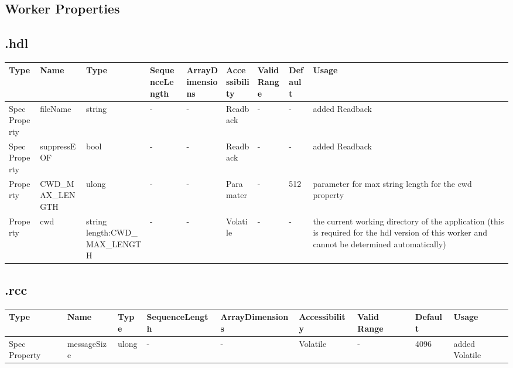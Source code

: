 \begin{landscape}
	\section*{Worker Properties}
	\subsection*{\comp.hdl}
	\begin{scriptsize}
\begin{tabular}{|p{2cm}|p{2.75cm}|p{3.5cm}|p{2cm}|p{2cm}|p{2.25cm}|p{1.5cm}|p{1cm}|p{4cm}|}
			\hline
			\rowcolor{blue}
			Type     & Name                      & Type  & SequenceLength & ArrayDimensions & Accessibility       & Valid Range & Default & Usage                                      \\
			\hline
			Spec Property & fileName & string  & - & - & Readback & -  &- & added Readback
            \\
            \hline
            Spec Property & suppressEOF & bool  & - & - & Readback & -  &- & added Readback
            \\
            \hline
            Property & CWD\_MAX\_LENGTH & ulong  & - & - & Paramater & -  & 512 & parameter for max string length for the cwd property
            \\
            \hline
            Property & cwd & string length:CWD\_MAX\_LENGTH & - & - & Volatile & -  &- & the current working directory of the application (this is required for the hdl version of this worker and cannot be determined automatically)
            \\
            \hline
    \end{tabular}
	\end{scriptsize}

	\subsection*{\comp.rcc}
    \begin{scriptsize}
    \begin{tabular}{|p{2cm}|p{2.75cm}|p{1cm}|p{2.75cm}|p{2cm}|p{2.25cm}|p{2cm}|p{1cm}|p{5cm}|}
			\hline
			\rowcolor{blue}
			Type     & Name                      & Type  & SequenceLength & ArrayDimensions & Accessibility       & Valid Range & Default & Usage                                      \\
			\hline
            Spec Property & messageSize & ulong  & - & - &  Volatile & -  &4096 & added Volatile
            \\
            \hline
    \end{tabular}
	\end{scriptsize}


\end{landscape}
